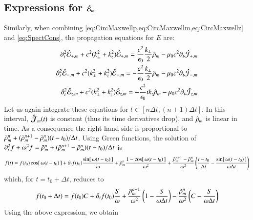 \subsection{Expressions for $\hat{\mathcal{E}}_m$}

Similarly, when combining \cref{eq:CircMaxwellp,eq:CircMaxwellm,eq:CircMaxwellz}
and \cref{eq:SpectCons}, the propagation equations for $E$ are:
\begin{subequations}
\begin{align}
\partial_t^2 \hat{\mathcal{E}}_{+,m} + c^2(k_\perp^2 + k_z^2) \hat{\mathcal{E}}_{+,m}
= \frac{c^2}{\epsilon_0} \frac{k_\perp}{2} \hat{\mathcal{\rho}}_m -
\mu_0c^2 \partial_t\hat{\mathcal{J}}_{+,m} \\
\partial_t^2 \hat{\mathcal{E}}_{-,m} + c^2(k_\perp^2 + k_z^2) \hat{\mathcal{E}}_{-,m}
= - \frac{c^2}{\epsilon_0} \frac{k_\perp}{2} \hat{\mathcal{\rho}}_m -
\mu_0c^2 \partial_t\hat{\mathcal{J}}_{-,m} \\
\partial_t^2 \hat{\mathcal{E}}_{z,m} + c^2(k_\perp^2 + k_z^2) \hat{\mathcal{E}}_{z,m}
= - \frac{c^2}{\epsilon_0} i k_z \hat{\mathcal{\rho}}_m -
\mu_0c^2 \partial_t\hat{\mathcal{J}}_{z,m} 
\end{align}
\end{subequations}
Let us again integrate these equations for $t\in [n\Delta t, (n+1)\Delta
t]$. In this interval, $\boldsymbol{\hat{\mathcal{J}}}_m(t)$ is constant (thus its time
derivatives drop), and $\hat{\mathcal{\rho}}_m$ is linear in time. As a
consequence the right hand side is proportional to $\tilde{\rho}_{m}^{n} +
(\tilde{\rho}_{m}^{n+1}-\tilde{\rho}_{m}^{n})(t-t_0)/\Delta t$. Using Green functions, the solution of 
$ \partial_t^2 f + \omega^2 f = \tilde{\rho}_{m}^{n} + (\tilde{\rho}_{m}^{n+1}-\tilde{\rho}_{m}^{n})(t-t_0)/\Delta t $ is
\begin{equation} f(t) = f(t_0) \cos[\,\omega(t-t_0)\,] + \partial_tf (t_0)
\frac{\sin[\,\omega(t-t_0)\,]}{\omega} + \tilde{\rho}_{m}^{n}\frac{1-
  \cos[\,\omega(t-t_0)\,]}{\omega^2} + \frac{\tilde{\rho}_{m}^{n+1}-\tilde{\rho}_{m}^{n}}{\omega^2}\left(
  \frac{t-t_0}{\Delta t} - \frac{\sin[\,\omega(t-t_0)\,]}{\omega
    \Delta t}
\right) \end{equation}
which, for $t=t_0 +\Delta t$, reduces to
\begin{equation} f(t_0 +\Delta t) = f(t_0) C + \partial_tf (t_0)
\frac{S}{\omega} 
+ \frac{\tilde{\rho}_{m}^{n+1}}{\omega^2}\left( 1 - \frac{S}{\omega\Delta t}\right) 
- \frac{\tilde{\rho}_{m}^{n}}{\omega^2}\left( C - \frac{S}{\omega\Delta t}\right) \end{equation}
Using the above expression, we obtain
